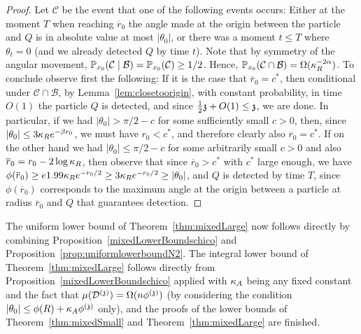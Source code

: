 \begin{proof}
 Let $\mathcal{C}$ be the event that one of the following events occurs: Either at the moment $T$ when reaching $\overline{r}_0$ the angle made at the origin between the particle and $Q$ is in absolute value at most $|\theta_0|$, or there was a moment $t \le T$ where $\theta_t=0$ (and we already detected $Q$ by time $t$). Note that by symmetry of the angular movement, $\PP_{x_0}(\mathcal{C} \mid \mathcal{B})=\PP_{x_0}(\mathcal{C}) \ge 1/2$. Hence, $\PP_{x_0}(\mathcal{C} \cap \mathcal{B})=\Omega(\KR^{-2\alpha})$. To conclude observe first the following:
 If it is the case that $\overline{r}_0=c^*$, then conditional under $\mathcal{C} \cap \mathcal{B}$, by Lemma~\ref{lem:closetoorigin}, with constant probability, in time $O(1)$ the particle $Q$ is detected, and since $\frac12\ss+O(1) \le \ss$, we are done. In particular, if 
we had $|\theta_0| > \pi/2 - c$ for some sufficiently small $c > 0$, then, since $|\theta_0| \le 3\KR e^{-\beta r_0}$, we must have $r_0 < c^*$, and therefore clearly also $\overline{r}_0=c^*$. If on the other hand we had  $|\theta_0| \le \pi/2 - c$ for some arbitrarily small $c > 0$ and also $\overline{r}_0=r_0-2\log \KR$, then observe that since $\overline{r}_0 > c^*$ with $c^*$ large enough, we have
$\phi(\overline{r}_0) \ge e 1.99\KR e^{-r_0/2} \ge 3\KR e^{-r_0/2} \ge |\theta_0|$, and $Q$ is detected by time $T$, since $\phi(\overline{r}_0)$ corresponds to the maximum angle at the origin between a particle at radius $\overline{r}_0$ and $Q$ that guarantees detection. 
\end{proof}

The uniform lower bound of Theorem~\ref{thm:mixedLarge} now follows directly by combining Proposition~\ref{mixedLowerBoundschico} and Proposition~\ref{prop:uniformlowerboundN2}. The integral lower bound of Theorem~\ref{thm:mixedLarge} follows directly from Proposition~\ref{mixedLowerBoundschico} applied with $\KA$ being any fixed constant and the fact that $\mu(\dt)=\Omega(n\phis)$ (by considering the condition $|\theta_0| \le \phi(R)+\KA \phis$ only), and the proofs of the lower bounds of Theorem~\ref{thm:mixedSmall} and Theorem~\ref{thm:mixedLarge} are finished. %
